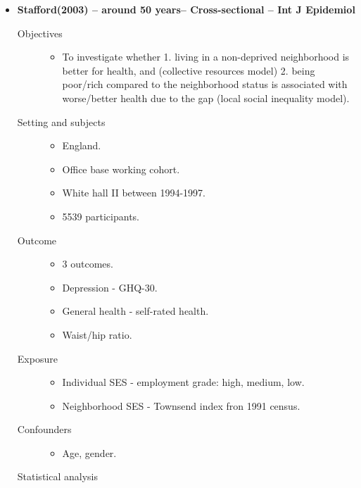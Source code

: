 \documentclass{article}
\begin{document}
\begin{itemize}	
	\item{\bf Stafford(2003) -- around 50 years-- Cross-sectional -- Int J Epidemiol} 
		\begin{description}
			\item[Objectives]\mbox{}\par
				\begin{itemize}
					\item To investigate whether 1. living in a non-deprived neighborhood is better for health, and (collective resources model) 2. being poor/rich compared to the neighborhood status is associated with worse/better health due to the gap (local social inequality model).
				\end{itemize}
			\item[Setting and subjects]\mbox{}\par 
				\begin{itemize}
					\item England.
					\item Office base working cohort.
					\item White hall II between 1994-1997.
					\item 5539 participants.
				\end{itemize}
			\item[Outcome]\mbox{}\par
				\begin{itemize}
					\item 3 outcomes.
					\item Depression - GHQ-30.
					\item General health - self-rated health.
					\item Waist/hip ratio.
				\end{itemize}
			\item[Exposure] \mbox{}\par
				\begin{itemize}
					\item Individual SES - employment grade: high, medium, low.
					\item Neighborhood SES - Townsend index fron 1991 census.
				\end{itemize}
			\item[Confounders] \mbox{}\par
				\begin{itemize}
					\item Age, gender.
				\end{itemize}
			\item[Statistical analysis]\mbox{}\par 

\end{description}
\end{itemize}
\end{document}
